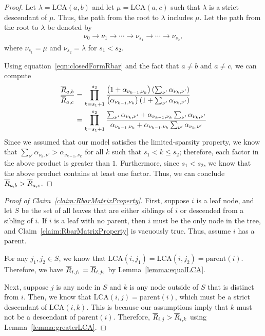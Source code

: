 \documentclass{article}
\theoremstyle{definition}
\begin{document}
\begin{proof}
Let $\lambda = \text{LCA}(a,b)$ and let $\mu = \text{LCA}(a,c)$ such that $\lambda$ is a strict descendant of $\mu$.
Thus, the path from the root to $\lambda$ includes $\mu$.
Let the path from the root to $\lambda$ be denoted by
\begin{align*}
\nu_0 \to \nu_1 \to \cdots \to \nu_{s_1} \to \cdots \to \nu_{s_2},
\end{align*}
where $\nu_{s_1} = \mu$ and $\nu_{s_2} = \lambda$ for $s_1 < s_2$.

Using equation~\eqref{eqn:closedFormRbar} and the fact that $a \neq b$ and $a \neq c$, we can compute
\begin{align}
\frac{\overline{R}_{a,b}}{\overline{R}_{a,c}}
&=
\prod_{k=s_1+1}^{s_2}
\frac
  { \left( 1 + \alpha_{\nu_{k-1}, \nu_k} \right) \left( \sum_{\nu'} \alpha_{\nu_k, \nu'} \right) }
  { \left( \alpha_{\nu_{k-1}, \nu_k} \right) \left( 1 + \sum_{\nu'} \alpha_{\nu_k, \nu'} \right) }
\\
&=
\prod_{k=s_1+1}^{s_2}
\frac
  { \sum_{\nu'} \alpha_{\nu_k, \nu'} + \alpha_{\nu_{k-1}, \nu_k} \sum_{\nu'} \alpha_{\nu_k, \nu'} }
  { \alpha_{\nu_{k-1}, \nu_k} + \alpha_{\nu_{k-1}, \nu_k} \sum_{\nu'} \alpha_{\nu_k, \nu'} }
\end{align}
%
Since we assumed that our model satisfies the limited-sparsity property, we know that $\sum_{\nu'} \alpha_{\nu_k, \nu'} > \alpha_{\nu_{k-1}, \nu_k}$ for all $k$ such that $s_1 < k \leq s_2$; therefore, each factor in the above product is greater than $1$.
Furthermore, since $s_1 < s_2$, we know that the above product contains at least one factor.
Thus, we can conclude $\overline{R}_{a,b} > \overline{R}_{a,c}$.
\end{proof}

\begin{proof}[Proof of Claim~\ref{claim:RbarMatrixProperty}]
First, suppose $i$ is a leaf node, and let $S$ be the set of all leaves that are either siblings of $i$ or descended from a sibling of $i$.
If $i$ is a leaf with no parent, then $i$ must be the only node in the tree, and Claim~\ref{claim:RbarMatrixProperty} is vacuously true.
Thus, assume $i$ has a parent.

For any $j_1, j_2 \in S$, we know that $\text{LCA}(i, j_1) = \text{LCA}(i, j_2) = \text{parent}(i)$.
Therefore, we have $\overline{R}_{i,j_1} = \overline{R}_{i,j_2}$ by Lemma~\ref{lemma:equalLCA}.

Next, suppose $j$ is any node in $S$ and $k$ is any node outside of $S$ that is distinct from $i$.
Then, we know that $\text{LCA}(i,j) = \text{parent}(i)$, which must be a strict descendant of $\text{LCA}(i,k)$.
This is because our assumptions imply that $k$ must not be a descendant of $\text{parent}(i)$.
Therefore, $\overline{R}_{i,j} > \overline{R}_{i,k}$ using Lemma~\ref{lemma:greaterLCA}.
\end{proof}
\end{document}
